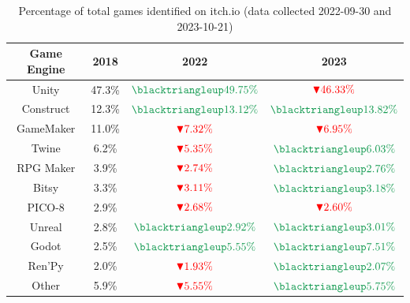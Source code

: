 \begin{table}[h!]
    \centering
    \begin{tabular}{|c c c c|}
        \hline
        Game Engine & 2018   & 2022                                                & 2023                                                \\
        \hline\hline
        Unity       & 47.3\% & $\textcolor{ForestGreen}{\blacktriangleup 49.75\%}$ & $\textcolor{red}{\blacktriangledown 46.33\%}$       \\
        Construct   & 12.3\% & $\textcolor{ForestGreen}{\blacktriangleup 13.12\%}$ & $\textcolor{ForestGreen}{\blacktriangleup 13.82\%}$ \\
        GameMaker   & 11.0\% & $\textcolor{red}{\blacktriangledown 7.32\%}$        & $\textcolor{red}{\blacktriangledown 6.95\%}$        \\
        Twine       & 6.2\%  & $\textcolor{red}{\blacktriangledown 5.35\%}$        & $\textcolor{ForestGreen}{\blacktriangleup 6.03\%}$  \\
        RPG Maker   & 3.9\%  & $\textcolor{red}{\blacktriangledown 2.74\%}$        & $\textcolor{ForestGreen}{\blacktriangleup 2.76\%}$  \\
        Bitsy       & 3.3\%  & $\textcolor{red}{\blacktriangledown 3.11\%}$        & $\textcolor{ForestGreen}{\blacktriangleup 3.18\%}$  \\
        PICO-8      & 2.9\%  & $\textcolor{red}{\blacktriangledown 2.68\%}$        & $\textcolor{red}{\blacktriangledown 2.60\%}$        \\
        Unreal      & 2.8\%  & $\textcolor{ForestGreen}{\blacktriangleup 2.92\%}$  & $\textcolor{ForestGreen}{\blacktriangleup 3.01\%}$  \\
        Godot       & 2.5\%  & $\textcolor{ForestGreen}{\blacktriangleup 5.55\%}$  & $\textcolor{ForestGreen}{\blacktriangleup 7.51\%}$  \\
        Ren'Py      & 2.0\%  & $\textcolor{red}{\blacktriangledown 1.93\%}$        & $\textcolor{ForestGreen}{\blacktriangleup 2.07\%}$  \\
        Other       & 5.9\%  & $\textcolor{red}{\blacktriangledown 5.55\%}$        & $\textcolor{ForestGreen}{\blacktriangleup 5.75\%}$  \\
        \hline
    \end{tabular}
    \caption{Percentage of total games identified on itch.io (data collected 2022-09-30 and 2023-10-21)}
    \label{table:itch}
\end{table}

